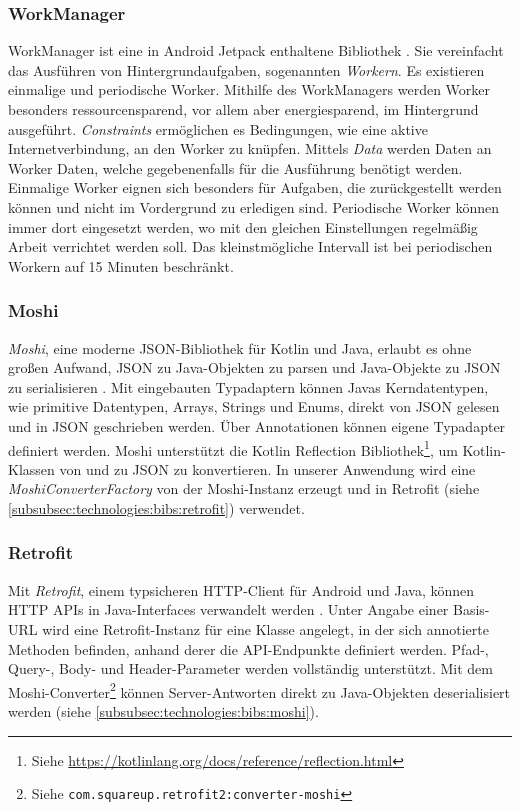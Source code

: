 \documentclass[a4paper]{article}
\begin{document}
\subsubsection{WorkManager}
\label{subsubsec:technologies:bibs:workmanager}
WorkManager ist eine in Android Jetpack enthaltene Bibliothek \autocite{android_workmanager}. Sie vereinfacht das Ausführen von Hintergrundaufgaben, sogenannten \textit{Workern}. Es existieren einmalige und periodische Worker. Mithilfe des WorkManagers werden Worker besonders ressourcensparend, vor allem aber energiesparend, im Hintergrund ausgeführt. \textit{Constraints} ermöglichen es Bedingungen, wie eine aktive Internetverbindung, an den Worker zu knüpfen. Mittels \textit{Data} werden Daten an Worker Daten, welche gegebenenfalls für die Ausführung benötigt werden. Einmalige Worker eignen sich besonders für Aufgaben, die zurückgestellt werden können und nicht im Vordergrund zu erledigen sind. Periodische Worker können immer dort eingesetzt werden, wo mit den gleichen Einstellungen regelmäßig Arbeit verrichtet werden soll. Das kleinstmögliche Intervall ist bei periodischen Workern auf 15 Minuten beschränkt.


\subsubsection{Moshi}
\label{subsubsec:technologies:bibs:moshi}
\textit{Moshi}, eine moderne JSON-Bibliothek für Kotlin und Java, erlaubt es ohne großen Aufwand, JSON zu Java-Objekten zu parsen und Java-Objekte zu JSON zu serialisieren \autocite{moshi}. Mit eingebauten Typadaptern können Javas Kerndatentypen, wie primitive Datentypen, Arrays, Strings und Enums, direkt von JSON gelesen und in JSON geschrieben werden. Über Annotationen können eigene Typadapter definiert werden. Moshi unterstützt die Kotlin Reflection Bibliothek\footnote{Siehe \url{https://kotlinlang.org/docs/reference/reflection.html}}, um Kotlin-Klassen von und zu JSON zu konvertieren.
In unserer Anwendung wird eine \textit{MoshiConverterFactory} von der Moshi-Instanz erzeugt und in Retrofit (siehe \autoref{subsubsec:technologies:bibs:retrofit}) verwendet.


\subsubsection{Retrofit}
\label{subsubsec:technologies:bibs:retrofit}
Mit \textit{Retrofit}, einem typsicheren HTTP-Client für Android und Java, können HTTP APIs in Java-Interfaces verwandelt werden \autocite{retrofit}. Unter Angabe einer Basis-URL wird eine Retrofit-Instanz für eine Klasse angelegt, in der sich annotierte Methoden befinden, anhand derer die API-Endpunkte definiert werden. Pfad-, Query-, Body- und Header-Parameter werden vollständig unterstützt. Mit dem Moshi-Converter\footnote{Siehe \texttt{com.squareup.retrofit2:converter-moshi}} können Server-Antworten direkt zu Java-Objekten deserialisiert werden (siehe \autoref{subsubsec:technologies:bibs:moshi}).
\end{document}
